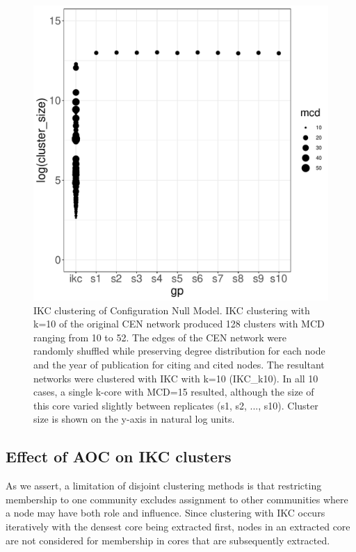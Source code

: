 \documentclass[12pt, oneside]{article}   	%
\begin{document}
\begin{figure}[H]
\centering
\includegraphics[width=0.6\linewidth]{shuffleplot.pdf} 
\captionsetup{width=0.9\textwidth}
\caption{IKC clustering of Configuration Null Model. IKC clustering with k=10 of the original CEN network produced 128 clusters  with MCD ranging from 10 to 52. The edges of the CEN network were randomly shuffled while preserving degree distribution for each node and the year of publication for citing and cited nodes. The resultant networks were clustered with IKC with k=10 (IKC\_k10).  In all 10 cases, a single k-core with MCD=15 resulted, although the size of this core varied slightly between replicates (s1, s2, ..., s10). Cluster size is shown on the y-axis in natural log units.}
\label{fig:shuffleplot}
\end{figure}
	
\subsection{Effect of AOC on IKC clusters} 
As we assert, a limitation of disjoint clustering methods is that restricting membership to one community excludes assignment to other communities where a node may have both role and influence. Since clustering with IKC occurs iteratively with the densest core being extracted first, nodes in an extracted core are not considered for membership in cores that are subsequently extracted.
\end{document}
